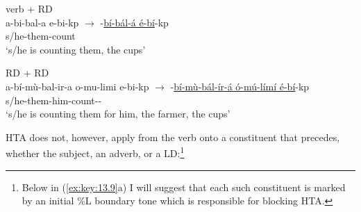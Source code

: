 \documentclass[output=paper]{langsci/langscibook}
\begin{document}
\ea\label{ex:key:13.5}
    \ea verb + RD\\
        a-bi-bal-a  e-bi-kp  ${\rightarrow}$
            -\underline{bí-bál-á é-bí}-kp\\
        {\footnotesize s/he{}-them{}-count}\\
        ‘s/he is counting them, the cups’
    \ex \gls{RD} + RD\\
        {\footnotesize
        a-bí-mù-bal-ir-a  o-mu-limi  e-bi-kp
            ${\rightarrow}$ -\underline{bí-mù-bál-ír-á  ó-mú-límí
            é-bí}-kp} \\
        {\footnotesize s/he{}-them-him-count-\Appl-\Fv{}} \\
        ‘s/he is counting them for him, the farmer, the cups’
    \z
\z

\gls{HTA} does not, however, apply from the verb onto a constituent that
precedes, whether the subject, an adverb, or a \gls{LD}:\footnote{Below in
    (\ref{ex:key:13.9}a) I will suggest that each such constituent is marked by an
    initial \%L boundary tone which is responsible for blocking \gls{HTA}.}
\end{document}
